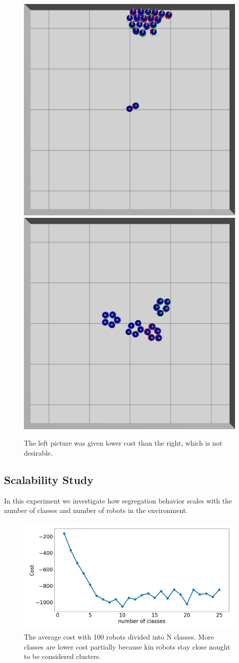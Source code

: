 \documentclass[conference]{IEEEtran}
\begin{document}
    \begin{figure}[H]
      \centering
      \includegraphics[width=0.49\linewidth]{./images/individual_0_gen_0.png}
      \includegraphics[width=0.49\linewidth]{./images/individual_0_gen_1_better.png}
      \caption{The left picture was given lower cost than the right, which is not desirable.}
      \label{fig:cost_function_fuckup}
    \end{figure}

  \subsection{Scalability Study} \label{section:scalability}

    In this experiment we investigate how segregation behavior scales with the number of classes and number of robots in the environment.

    \begin{figure}[H]
      \centering
      \includegraphics[width=1\linewidth]{./images/num_classes_vs_cost_100_robots.png}
      \caption{The average cost with 100 robots divided into N classes. More classes are lower cost partially because kin robots stay close nought to be considered clusters.}
      \label{fig:num_classes_100}
    \end{figure}
\end{document}
